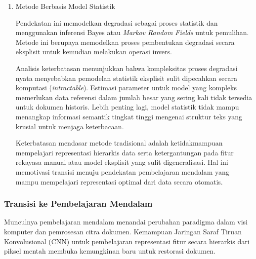 \begin{enumerate}[leftmargin=*, labelindent=0pt, itemsep=1ex, topsep=0pt]
Selain itu, proses optimisasi untuk fungsi energi non-cembung memerlukan biaya komputasi tinggi dan sering terjebak pada minimum lokal. Kualitas hasil sangat sensitif terhadap kondisi awal dan parameter regularisasi, yang kembali memerlukan penyesuaian manual oleh ahli.

\item Metode Berbasis Model Statistik
\label{para:metode-statistik}

Pendekatan ini memodelkan degradasi sebagai proses statistik dan menggunakan inferensi Bayes atau \textit{Markov Random Fields} untuk pemulihan. Metode ini berupaya memodelkan proses pembentukan degradasi secara eksplisit untuk kemudian melakukan operasi invers.

Analisis keterbatasan menunjukkan bahwa kompleksitas proses degradasi nyata menyebabkan pemodelan statistik eksplisit sulit dipecahkan secara komputasi (\textit{intractable}). Estimasi parameter untuk model yang kompleks memerlukan data referensi dalam jumlah besar yang sering kali tidak tersedia untuk dokumen historis. Lebih penting lagi, model statistik tidak mampu menangkap informasi semantik tingkat tinggi mengenai struktur teks yang krusial untuk menjaga keterbacaan.

Keterbatasan mendasar metode tradisional adalah ketidakmampuan mempelajari representasi hierarkis data serta ketergantungan pada fitur rekayasa manual atau model eksplisit yang sulit digeneralisasi. Hal ini memotivasi transisi menuju pendekatan pembelajaran mendalam yang mampu mempelajari representasi optimal dari data secara otomatis.

\end{enumerate}

\subsubsection{Transisi ke Pembelajaran Mendalam}
\label{subsubsec:transisi-deep-learning}


Munculnya pembelajaran mendalam menandai perubahan paradigma dalam visi komputer dan pemrosesan citra dokumen. Kemampuan Jaringan Saraf Tiruan Konvolusional (CNN) untuk pembelajaran representasi fitur secara hierarkis dari piksel mentah membuka kemungkinan baru untuk restorasi dokumen.

